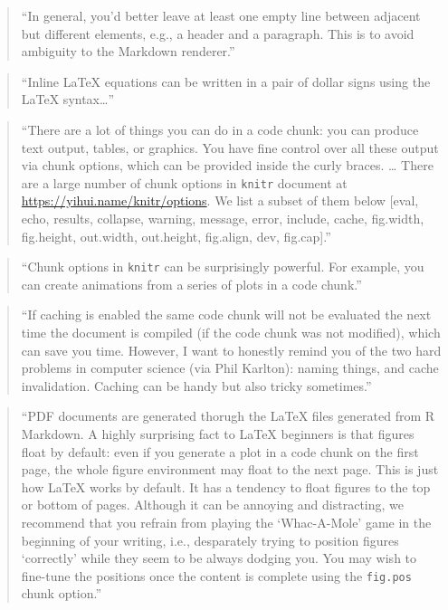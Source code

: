 \documentclass[]{tufte-book}
\begin{document}
\begin{quote}
``In general, you'd better leave at least one empty line between adjacent
but different elements, e.g., a header and a paragraph. This is to avoid
ambiguity to the Markdown renderer.'' \citep{xie2018r}
\end{quote}

\begin{quote}
``Inline LaTeX equations can be written in a pair of dollar signs using the
LaTeX syntax\ldots{}'' \citep{xie2018r}
\end{quote}

\begin{quote}
``There are a lot of things you can do in a code chunk: you can produce
text output, tables, or graphics. You have fine control over all these output
via chunk options, which can be provided inside the curly braces. \ldots{} There are
a large number of chunk options in \texttt{knitr} document at \url{https://yihui.name/knitr/options}. We list a subset of them below {[}eval, echo, results, collapse, warning, message, error, include, cache, fig.width, fig.height, out.width, out.height, fig.align, dev, fig.cap{]}.'' \citep{xie2018r}
\end{quote}

\begin{quote}
``Chunk options in \texttt{knitr} can be surprisingly powerful. For example,
you can create animations from a series of plots in a code chunk.'' \citep{xie2018r}
\end{quote}

\begin{quote}
``If caching is enabled the same code chunk will not be evaluated the next
time the document is compiled (if the code chunk was not modified), which can
save you time. However, I want to honestly remind you of the two hard problems
in computer science (via Phil Karlton): naming things, and cache invalidation.
Caching can be handy but also tricky sometimes.'' \citep{xie2018r}
\end{quote}

\begin{quote}
``PDF documents are generated thorugh the LaTeX files generated from R
Markdown. A highly surprising fact to LaTeX beginners is that figures float
by default: even if you generate a plot in a code chunk on the first page,
the whole figure environment may float to the next page. This is just how
LaTeX works by default. It has a tendency to float figures to the top or
bottom of pages. Although it can be annoying and distracting, we recommend
that you refrain from playing the `Whac-A-Mole' game in the beginning of your
writing, i.e., desparately trying to position figures `correctly' while
they seem to be always dodging you. You may wish to fine-tune the positions
once the content is complete using the \texttt{fig.pos} chunk option.'' \citep{xie2018r}
\end{quote}
\end{document}
